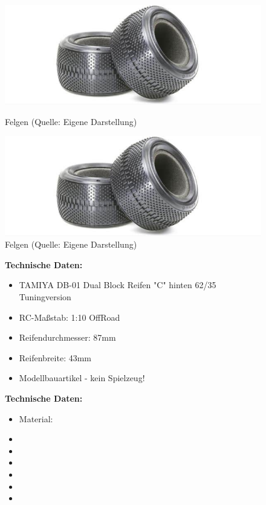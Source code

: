 \begin{figure}[htb]
	\centering
	\begin{minipage}{0.45\linewidth}
		\centering
		\includegraphics[scale=0.5]{images/reifen.png}
		\caption{Felgen \newline (Quelle: Eigene Darstellung)}
	\end{minipage}
	\begin{minipage}{0.45\linewidth}
		\centering
		\includegraphics[scale=0.5]{images/reifen.png}
		\caption{Felgen \newline (Quelle: Eigene Darstellung)}
	\end{minipage}
\end{figure}


\begin{figure}[htb]
	\centering
	\begin{minipage}{0.4\linewidth}
		\textbf{Technische Daten:} 
		\begin{itemize} 
			\item TAMIYA DB-01 Dual Block Reifen "C" hinten 62/35 Tuningversion
			\item RC-Maßstab:  1:10 OffRoad
			\item Reifendurchmesser: 87mm
			\item Reifenbreite: 43mm
			\item Modellbauartikel - kein Spielzeug!
		\end{itemize}
	\end{minipage}
	\begin{minipage}[h]{0.4\textwidth}
		\textbf{Technische Daten:} 
		\begin{itemize} 
			\item Material:
			\item 
			\item 
			\item 
			\item 
			\item 
			\item 
		\end{itemize}
	\end{minipage}
\end{figure}

